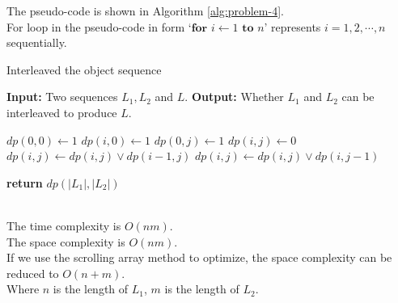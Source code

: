 The pseudo-code is shown in Algorithm \ref{alg:problem-4}.\\
For loop in the pseudo-code in form `$\textbf{for } i \gets 1 \textbf{ to } n$' represents $i=1,2,\cdots,n$ sequentially.
\begin{algorithm}
    \caption{Interleaved the object sequence}
    \begin{algorithmic}[1]
    \State \textbf{Input:} Two sequences $L_1, L_2$ and $L$.
    \State \textbf{Output:} Whether $L_1$ and $L_2$ can be interleaved to produce $L$.
        
    \State $dp(0,0) \gets 1$
            \State $dp(i,0) \gets 1$
        \EndIf
    \EndFor
            \State $dp(0,j) \gets 1$
        \EndIf
    \EndFor
            \State $dp(i,j) \gets 0$
                \State $dp(i,j) \gets dp(i,j) \lor dp(i-1,j)$
            \EndIf
                \State $dp(i,j) \gets dp(i,j) \lor dp(i,j-1)$
            \EndIf
        \EndFor
    \EndFor
    
    \State \textbf{return} $dp(|L_1|,|L_2|)$
    \end{algorithmic}
    \label{alg:problem-4}
\end{algorithm}\\
The time complexity is $O(nm)$.\\
The space complexity is $O(nm)$.\\
If we use the scrolling array method to optimize, the space complexity can be reduced to $O(n+m)$.\\
Where $n$ is the length of $L_1$, $m$ is the length of $L_2$.\\

\newpage